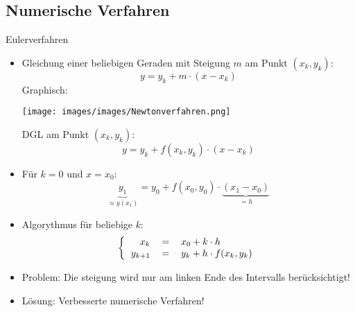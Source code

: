 \subsection{Numerische Verfahren}
\begin{definition}{Eulerverfahren}
  \begin{itemize}
    \item Gleichung einer beliebigen Geraden mit Steigung \(m\) am Punkt \((x_k,y_k)\):
      \[y=y_k+m\cdot(x-x_k)\] 
      Graphisch:
  \begin{center}
  \texttt{[image: images/images/Newtonverfahren.png]}
  \end{center}
      DGL am Punkt \((x_k,y_k)\):
      \[y=y_k+f(x_k,y_k)\cdot (x-x_k)\]
    \item Für \(k=0 \text{ und } x=x_0\):
      \[\underbrace{y_1}_{\approx y(x_1)}=y_0+f(x_0,y_0)\cdot\underbrace{(x_1-x_0)}_{=h}\]
    \item Algorythmus für beliebige \(k\):
      \[\left\{\begin{tabular}{rcl}
	  \(x_k\)&\(=\)&\(x_0+k\cdot h\)\\
	  \(y_{k+1}\)&\(=\)&\(y_k+h\cdot f(x_k,y_k)\)
	\end{tabular}
      \right.\]
    \item Problem: Die steigung wird nur am linken Ende des Intervalls berücksichtigt!
    \item Lösung: Verbesserte numerische Verfahren!
  \end{itemize}
\end{definition}
